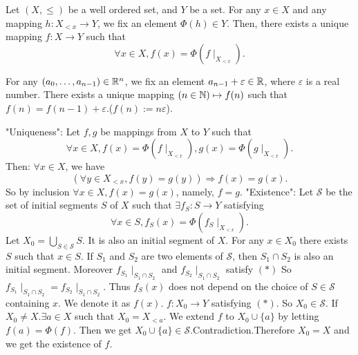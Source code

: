 \documentclass{book}
\numberwithin{equation}{section}
\begin{document}
\begin{theoremenv}
    Let $(X,\le)$ be a well ordered set, and $Y$ be a set. For any $x\in X$ and any mapping $h:X_{<x}\rightarrow Y$, we fix an element $\Phi(h)\in Y$. Then, there exists a unique mapping $f:X\rightarrow Y$  such that 
    $$\forall x\in X, f(x)=\Phi(f\mid_{X_{<x}}).$$
\end{theoremenv}
\begin{exampleenv}
    For any $(a_0,\dots,a_{n-1})\in \mathbb{R}^n$, we fix an element $a_{n-1}+\varepsilon\in \mathbb{R}$, where $\varepsilon$ is a real number. There exists a unique mapping $(n\in \mathbb{N})\mapsto f(n)$ such that $f(n)=f(n-1)+\varepsilon$.($f(n):=n\varepsilon$).
\end{exampleenv}
\begin{proofenv}
    \quad
    \newline
    "Uniqueness": 
    \newline
    Let $f,g$ be mappings from $X$ to $Y$ such that 
    $$\forall x\in X,f(x)=\Phi(f\mid_{X_{<x}}),g(x)=\Phi(g\mid_{X_{<x}}).$$
    Then: $\forall x\in X$, we have 
    $$(\forall y\in X_{<x},f(y)=g(y))\Rightarrow f(x)=g(x).$$
    So by inclusion $\forall x \in X, f(x)=g(x)$, namely, $f=g$.
    \newline
    "Existence": 
    \newline
    Let $\mathscr{S}$  be the set of initial segments $S$ of $X$ such that $\exists f_S:S\rightarrow Y$ satisfying 
    \begin{equation*}
        \forall x\in S,f_S(x)=\Phi(f_S\mid_{X_{<x}}). \tag{$*$}
    \end{equation*}
    Let $X_0=\bigcup_{S\in\mathscr{S} }S$. It is also an initial segment of $X$. For any $x\in X_0$ there exists $ S $ such that $x\in S$. If $S_1$ and $S_2$ are two elements of $\mathscr{S}$, then $S_1\cap S_2$ is also an initial segment. Moreover $f_{S_1}\mid_{S_1\cap S_2}$ and $f_{S_2}\mid_{S_1\cap S_2}$ satisfy $(*)$ So $f_{S_1}\mid_{S_1\cap S_2}=f_{S_2}\mid_{S_1\cap S_2}$. Thus $f_S(x)$ does not depend on the choice of $S\in \mathscr{S}$ containing $x$. We denote it as $f(x)$. $f:X_0\rightarrow Y$ satisfying $(*)$. So $X_0\in \mathscr{S}$.
    If $X_0\not=X.\exists a\in X$ such that $ X_0=X_{<a}$. We extend $f$ to $X_0\cup\{a\}$ by letting $f(a)=\Phi(f)$. Then we get $X_0\cup\{a\}\in \mathscr{S}$.Contradiction.Therefore $X_0=X$  and we get the existence of $f$. 
\end{proofenv}
\end{document}
